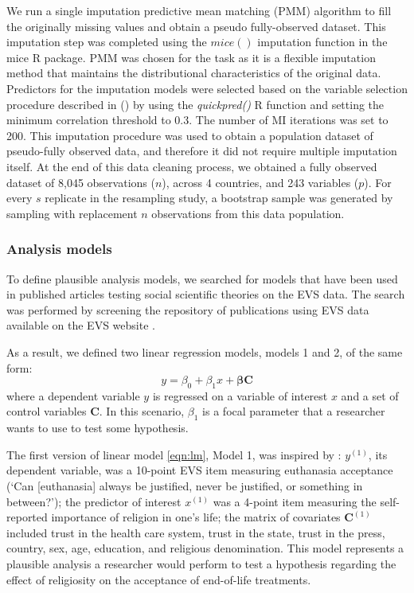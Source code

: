 	We run a single imputation predictive mean matching (PMM) algorithm to fill the originally missing values 
	and obtain a pseudo fully-observed dataset.
	This imputation step was completed using the $mice()$ imputation function in the mice R package.
	PMM was chosen for the task as it is a flexible imputation method that maintains the distributional 
	characteristics of the original data.
	Predictors for the imputation models were selected based on the variable selection procedure described in
	\citeauthor{vanBuurenEtAl:1999} (\citeyear[pp. 687–688]{vanBuurenEtAl:1999}) by using the \emph{quickpred()}
	R function and setting the minimum correlation threshold to 0.3.
	The number of MI iterations was set to 200.
	This imputation procedure was used to obtain a population dataset of pseudo-fully observed data, and 
	therefore it did not require multiple imputation itself.
	At the end of this data cleaning process, we obtained a fully observed dataset of 8,045 observations 
	($n$), across 4 countries, and 243 variables ($p$).
	For every $s$ replicate in the resampling study, a bootstrap sample was generated by sampling with 
	replacement $n$ observations from this data population.

\subsubsection{Analysis models}

	To define plausible analysis models, we searched for models that have been used in published articles
	testing social scientific theories on the EVS data.
	The search was performed by screening the repository of publications using EVS data available on the EVS 
	website \citep{EVSbib}.

	As a result, we defined two linear regression models, models 1 and 2, of the same form:
%	
	\begin{equation}
		y = \beta_{0} + \beta_{1} x + \bm{\beta} \bm{C}  \label{eqn:lm}
	\end{equation}
%
	where a dependent variable $y$ is regressed on a variable of interest $x$ and a set of control variables
	$\bm{C}$.
	In this scenario, $\beta_{1}$ is a focal parameter that a researcher wants to use to test some hypothesis.

	The first version of linear model \eqref{eqn:lm}, Model 1, was inspired by \cite{koneke:2014}:
	$y^{(1)}$, its dependent variable, was a 10-point EVS item measuring euthanasia acceptance 
	(`Can [euthanasia] always be justified, never be justified, or something in between?');
	the predictor of interest $x^{(1)}$ was a 4-point item measuring the self-reported importance of religion in 
	one's life;
	the matrix of covariates $\bm{C}^{(1)}$ included trust in the health care system, trust in the state, 
	trust in the press, country, sex, age, education, and religious denomination.
	This model represents a plausible analysis a researcher would perform to test a hypothesis regarding the 
	effect of religiosity on the acceptance of end-of-life treatments.

